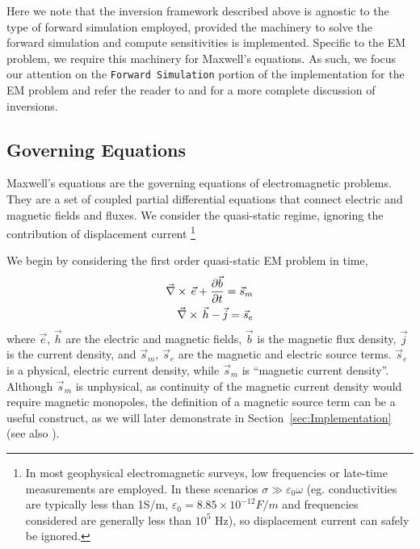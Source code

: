 \bigskip

Here we note that the inversion framework described above is agnostic to the
type of forward simulation employed, provided the machinery to solve the
forward simulation and compute sensitivities is implemented. Specific to the
EM problem, we require this machinery for Maxwell's equations. As such, we
focus our attention  on the \texttt{Forward Simulation} portion of the
implementation for the EM problem and refer the reader to
\cite{Cockett2015} and \cite{OldenburgTutorial} for a more complete discussion
of  inversions.



\subsection{Governing Equations}
\label{sec:GoverningEquations}

Maxwell's equations are the governing equations of electromagnetic problems.
They are a set of coupled partial differential equations that connect electric
and magnetic fields and fluxes. We consider the quasi-static regime, ignoring
the contribution of displacement current \citep{Ward1988, telford1990applied,
Haber2014a} \footnote{In most geophysical electromagnetic surveys, low frequencies or late-time measurements are employed. In these scenarios $\sigma \gg \varepsilon_0 \omega$ (eg. conductivities are typically less than 1S/m, $\varepsilon_0 = 8.85 \times 10^{-12} F/m$ and frequencies considered are generally less than $10^5$ Hz), so displacement current can safely be ignored.}

We begin by considering the first order quasi-static EM problem in time,
\begin{equation}
\begin{split}
{\vec \nabla}\times\, \vec{e} + \frac{\partial \vec{b}}{\partial t} = \vec{s}_m \\
{\vec \nabla}\times\, \vec{h} - \vec{j} = \vec{s}_e
\end{split}
\label{eq:MaxwellBasicTime}
\end{equation}
where $\vec{e}$, $\vec{h}$ are the electric and magnetic fields, $\vec{b}$ is the magnetic flux density, $\vec{j}$ is the current density, and $\vec{s}_m$, $\vec{s}_e$ are the magnetic and electric source terms. $\vec{s}_e$ is a physical, electric current density, while $\vec{s}_m$ is ``magnetic current density''. Although $\vec{s}_m$ is unphysical, as continuity of the magnetic current density would require magnetic monopoles, the definition of a magnetic source term can be a useful construct, as we will later demonstrate in Section~\ref{sec:Implementation} (see also \cite{Ward1988}).

